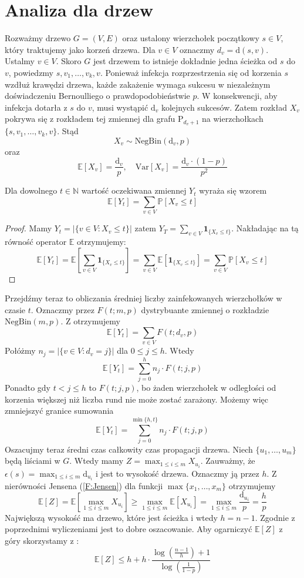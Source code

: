 \section{Analiza dla drzew}

Rozważmy drzewo $G = (V, E)$ oraz ustalony wierzchołek początkowy $s \in V$, 
który traktujemy jako korzeń drzewa. Dla $v\in V$ oznaczmy  $d_v=\mathrm{d}(s,v)$. Ustalmy $v\in V$. Skoro $G$ jest drzewem to istnieje dokładnie jedna ścieżka od $s$ do $v$, powiedzmy $s,v_1,\dots,v_k, v$. Ponieważ infekcja rozprzestrzenia się od korzenia $s$ wzdłuż krawędzi drzewa, 
każde zakażenie wymaga sukcesu w niezależnym doświadczeniu Bernoulliego o prawdopodobieństwie $p$.
W konsekwencji, aby infekcja dotarła z $s$ do $v$, 
musi wystąpić $\mathrm{d}_v$ kolejnych sukcesów. Zatem rozkład $X_v$ pokrywa się z rozkładem tej zmiennej dla grafu $\mathrm{P}_{d_v+1}$ na wierzchołkach $\{s,v_1,\dots,v_k, v\}$. Stąd 
\[
    X_v\sim \mathrm{NegBin}(\mathrm{d}_v,p)
\]
oraz
\[
    \mathbb{E}[X_v] = \frac{\mathrm{d}_v}{p}, \quad \mathrm{Var}[X_v] = \frac{\mathrm{d}_v\cdot(1 - p)}{p^2}
\]
\begin{lemma}\label{L:Formula_EYt}
Dla dowolnego $t\in\mathbb{N}$ wartość oczekiwana zmiennej $Y_t$ wyraża się wzorem
\[
    \mathbb{E}[Y_t] = \sum_{v\in V} \mathbb{P}[X_v \le t]
\]    
\end{lemma}

\begin{proof}
Mamy $Y_t=|\{v\in V: X_v \le t\}|$ zatem $Y_T=\sum_{v\in V}  \mathbf{1}_{\{X_v\le t\}}$. Nakładając na tą równość operator $\mathbb{E}$ otrzymujemy:
\[
    \mathbb{E}[Y_t] = \mathbb{E}\left[ \sum_{v\in V}  \mathbf{1}_{\{X_v\le t\}}\right]= \sum_{v\in V} \mathbb{E}[\mathbf{1}_{\{X_v\le t\}}] = \sum_{v\in V} \mathbb{P}[X_v \le t]
\]    
\end{proof}

Przejdźmy teraz to obliczania średniej liczby zainfekowanych wierzchołków w czasie $t$. Oznaczmy przez $F(t;m,p)$ dystrybuante zmiennej o rozkładzie $\mathrm{NegBin}(m,p)$. Z  otrzymujemy
\[
    \mathbb{E}[Y_t] = \sum_{v\in V} F(t; d_v, p)
\]
Połóżmy $n_j = |\{v\in V: d_v=j\}|$ dla $0\le j \le h$. Wtedy 
\[
    \mathbb{E}[Y_t] = \sum_{j=0}^{h} n_j\cdot F(t; j, p)
\]
Ponadto gdy $t<j\le h$ to $F(t; j, p)$, bo żaden wierzchołek w odległości od korzenia większej niż liczba rund nie może zostać zarażony. Możemy więc zmniejszyć granice sumowania 
\[
    \mathbb{E}[Y_t] = \sum_{j=0}^{\min\{h,t\}} n_j\cdot F(t; j, p)
\]
Oszacujmy teraz średni czas całkowity czas propagacji drzewa.
Niech $\{u_1,\dots, u_m\}$ będą liściami w $G$. Wtedy mamy $Z = \max_{1\le i \le m} X_{u _i}$.
Zauważmy, że $\epsilon(s) = \max_{1\le i \le m} \mathrm{d}_{u_i}$ i jest to wysokość drzewa. Oznaczmy ją przez $h$. Z nierówności Jensena (\cref{F:Jensen}) dla funkcji $\max\{x_1,\dots,x_m\}$ otrzymujemy
\[
    \mathbb{E}[Z]=\mathbb{E}[\max_{1\le i \le m} X_{u _i}] \ge \max_{1\le i \le m} \mathbb{E}[X_{u _i}] = \max_{1\le i \le m} \frac{\mathrm{d}_{u_i}}{p} = \frac{h}{p}
\]
Największą wysokość ma drzewo, które jest ścieżka i wtedy $h=n-1$. Zgodnie z poprzednimi wyliczeniami jest to dobre oszacowanie. Aby ogarniczyć $\mathbb{E}[Z]$ z góry skorzystamy z :
\[
    \mathbb{E}[Z] \le h  + h \cdot \frac{\log(\frac{n-1}{h}) + 1}{\log(\frac{1}{1-p})}
\]
